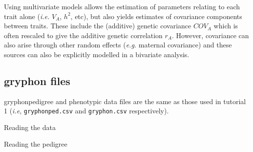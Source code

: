 \documentclass[
  12pt,
]{book}
\newenvironment{Shaded}{\begin{snugshade}}{\end{snugshade}}
\newcommand{\FunctionTok}[1]{\textcolor[rgb]{0.00,0.00,0.00}{#1}}
\newcommand{\NormalTok}[1]{#1}
\newcommand{\OtherTok}[1]{\textcolor[rgb]{0.56,0.35,0.01}{#1}}
\newcommand{\SpecialCharTok}[1]{\textcolor[rgb]{0.00,0.00,0.00}{#1}}
\newcommand{\StringTok}[1]{\textcolor[rgb]{0.31,0.60,0.02}{#1}}
\begin{document}
Using multivariate models allows the estimation of parameters relating to each trait alone (\emph{i.e.} \(V_A\), \(h^2\), etc), but also yields estimates of covariance components between traits. These include the (additive) genetic covariance \(COV_A\) which is often rescaled to give the additive genetic correlation \(r_A\). However, covariance can also arise through other random effects (\emph{e.g.} maternal covariance) and these sources can also be explicitly modelled in a bivariate analysis.

\hypertarget{gryphon-files}{%
\subsection{gryphon files}\label{gryphon-files}}

gryphonpedigree and phenotypic data files are the same as those used in tutorial 1 (\emph{i.e}, \texttt{gryphonped.csv} and \texttt{gryphon.csv} respectively).

Reading the data

\begin{Shaded}
\end{Shaded}

Reading the pedigree
\end{document}
